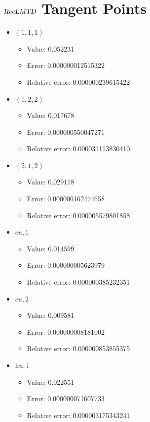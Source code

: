 \documentclass{article}%
\begin{document}
\section{$\textsl{RecLMTD}$ Tangent Points}%
\thispagestyle{plain}%
\begin{itemize}%
	\item $(1, 1, 1)$%
	\begin{itemize}%
		\item Value: 0.052231%
		\item Error: 0.000000012515322%
		\item Relative error: 0.000000239615422%
	\end{itemize}%
	\item $(1, 2, 2)$%
	\begin{itemize}%
		\item Value: 0.017678%
		\item Error: 0.000000550047271%
		\item Relative error: 0.000031113830410%
	\end{itemize}%
	\item $(2, 1, 2)$%
	\begin{itemize}%
		\item Value: 0.029118%
		\item Error: 0.000000162474658%
		\item Relative error: 0.000005579801858%
	\end{itemize}%
	\item $\textit{cu},1$%
	\begin{itemize}%
		\item Value: 0.014599%
		\item Error: 0.000000005623979%
		\item Relative error: 0.000000385232351%
	\end{itemize}%
	\item $\textit{cu},2$%
	\begin{itemize}%
		\item Value: 0.009581%
		\item Error: 0.000000008181002%
		\item Relative error: 0.000000853855375%
	\end{itemize}%
	\item $\textit{hu},1$%
	\begin{itemize}%
		\item Value: 0.022551%
		\item Error: 0.000000071607733%
		\item Relative error: 0.000003175343241%
	\end{itemize}%
\end{itemize}%
\end{document}
